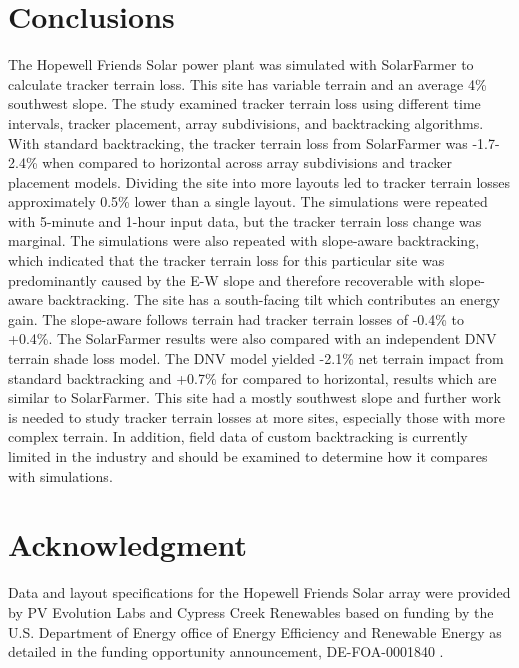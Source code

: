 \documentclass[conference]{IEEEtran}
\begin{document}
\section{Conclusions}
The Hopewell Friends Solar power plant was simulated with SolarFarmer to calculate tracker terrain loss. This site has variable terrain and an average 4\% southwest slope. The study examined tracker terrain loss using different time intervals, tracker placement, array subdivisions, and backtracking algorithms. With standard backtracking, the tracker terrain loss from SolarFarmer was -1.7-2.4\% when compared to horizontal across array subdivisions and tracker placement models. Dividing the site into more layouts led to tracker terrain losses approximately 0.5\% lower than a single layout. The simulations were repeated with 5-minute and 1-hour input data, but the tracker terrain loss change was marginal. The simulations were also repeated with slope-aware backtracking, which indicated that the tracker terrain loss for this particular site was predominantly caused by the E-W slope and therefore recoverable with slope-aware backtracking. The site has a south-facing tilt which contributes an energy gain. The slope-aware follows terrain had tracker terrain losses of -0.4\% to +0.4\%. The SolarFarmer results were also compared with an independent DNV terrain shade loss model. The DNV model yielded -2.1\% net terrain impact from standard backtracking and +0.7\% for compared to horizontal, results which are similar to SolarFarmer. This site had a mostly southwest slope and further work is needed to study tracker terrain losses at more sites, especially those with more complex terrain. In addition, field data of custom backtracking is currently limited in the industry and should be examined to determine how it compares with simulations.

\section*{Acknowledgment}

Data and layout specifications for the Hopewell Friends Solar array were provided by PV Evolution Labs and Cypress Creek Renewables based on funding by the U.S. Department of Energy office of Energy Efficiency and Renewable Energy as detailed in the funding opportunity announcement, DE-FOA-0001840 \cite{CypressCreekRenewables2019}.



\end{document}
